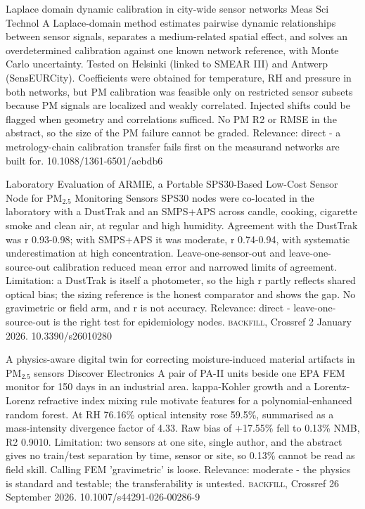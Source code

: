 \documentclass[10pt]{article}
\begin{document}
\par{}\baselineskip{}\baselineskip
{}

{Laplace domain dynamic calibration in city-wide sensor networks}
{Meas Sci Technol}
{A Laplace-domain method estimates pairwise dynamic relationships between sensor signals, separates a medium-related spatial effect, and solves an overdetermined calibration against one known network reference, with Monte Carlo uncertainty. Tested on Helsinki (linked to SMEAR III) and Antwerp (SensEURCity). Coefficients were obtained for temperature, RH and pressure in both networks, but PM calibration was feasible only on restricted sensor subsets because PM signals are localized and weakly correlated. Injected shifts could be flagged when geometry and correlations sufficed. No PM R2 or RMSE in the abstract, so the size of the PM failure cannot be graded. Relevance: direct - a metrology-chain calibration transfer fails first on the measurand networks are built for.}
{10.1088/1361-6501/aebdb6}

{Laboratory Evaluation of ARMIE, a Portable SPS30-Based Low-Cost Sensor Node for PM$_{2.5}$ Monitoring}
{Sensors}
{SPS30 nodes were co-located in the laboratory with a DustTrak and an SMPS+APS across candle, cooking, cigarette smoke and clean air, at regular and high humidity. Agreement with the DustTrak was r 0.93-0.98; with SMPS+APS it was moderate, r 0.74-0.94, with systematic underestimation at high concentration. Leave-one-sensor-out and leave-one-source-out calibration reduced mean error and narrowed limits of agreement. Limitation: a DustTrak is itself a photometer, so the high r partly reflects shared optical bias; the sizing reference is the honest comparator and shows the gap. No gravimetric or field arm, and r is not accuracy. Relevance: direct - leave-one-source-out is the right test for epidemiology nodes. \textsc{backfill}, Crossref 2 January 2026.}
{10.3390/s26010280}

{A physics-aware digital twin for correcting moisture-induced material artifacts in PM$_{2.5}$ sensors}
{Discover Electronics}
{A pair of PA-II units beside one EPA FEM monitor for 150 days in an industrial area. kappa-Kohler growth and a Lorentz-Lorenz refractive index mixing rule motivate features for a polynomial-enhanced random forest. At RH 76.16\% optical intensity rose 59.5\%, summarised as a mass-intensity divergence factor of 4.33. Raw bias of +17.55\% fell to 0.13\% NMB, R2 0.9010. Limitation: two sensors at one site, single author, and the abstract gives no train/test separation by time, sensor or site, so 0.13\% cannot be read as field skill. Calling FEM 'gravimetric' is loose. Relevance: moderate - the physics is standard and testable; the transferability is untested. \textsc{backfill}, Crossref 26 September 2026.}
{10.1007/s44291-026-00286-9}
\end{document}
